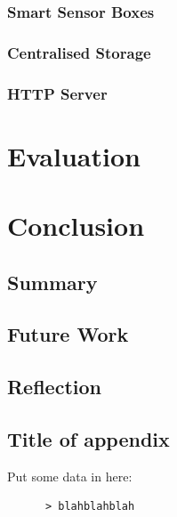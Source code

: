 \documentclass{l4proj}
\begin{document}
\subsection{Smart Sensor Boxes}
\subsection{Centralised Storage}
\subsection{HTTP Server}


\chapter{Evaluation}



\chapter{Conclusion}
\section{Summary}
\section{Future Work}
\section{Reflection}


\begin{appendices}

\chapter{Title of appendix}
Put some data in here:
\begin{verbatim}
      > blahblahblah
\end{verbatim}

\end{appendices}




\end{document}
